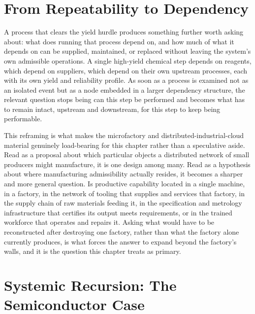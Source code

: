 \documentclass[11pt]{book}
\begin{document}
\section{From Repeatability to Dependency}

A process that clears the yield hurdle produces something further worth asking about: what does running that process depend on, and how much of what it depends on can be supplied, maintained, or replaced without leaving the system's own admissible operations. A single high-yield chemical step depends on reagents, which depend on suppliers, which depend on their own upstream processes, each with its own yield and reliability profile. As soon as a process is examined not as an isolated event but as a node embedded in a larger dependency structure, the relevant question stops being can this step be performed and becomes what has to remain intact, upstream and downstream, for this step to keep being performable.

This reframing is what makes the microfactory and distributed-industrial-cloud material genuinely load-bearing for this chapter rather than a speculative aside. Read as a proposal about which particular objects a distributed network of small producers might manufacture, it is one design among many. Read as a hypothesis about where manufacturing admissibility actually resides, it becomes a sharper and more general question. Is productive capability located in a single machine, in a factory, in the network of tooling that supplies and services that factory, in the supply chain of raw materials feeding it, in the specification and metrology infrastructure that certifies its output meets requirements, or in the trained workforce that operates and repairs it. Asking what would have to be reconstructed after destroying one factory, rather than what the factory alone currently produces, is what forces the answer to expand beyond the factory's walls, and it is the question this chapter treats as primary.

\section{Systemic Recursion: The Semiconductor Case}
\end{document}

